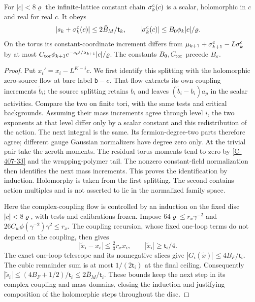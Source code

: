 \documentclass[11pt,letterpaper,reqno]{amsart}
\makeatletter
\theoremstyle{definition}
\newcommand{\ms@minorstart}{%
  \pushQED{\qed}\renewcommand{\qedsymbol}{$\blacksquare$}}
\newenvironment{proposition}[1][]{\ms@minorstart\ms@proposition[#1]}
  {\popQED\endms@proposition}
\theoremstyle{remark}
\makeatother
\begin{document}
\begin{proposition}[The constant reference chain]\label{C-407-17}
For $|c|<8\varrho$ the infinite-lattice constant chain
$\sigma_k^{\rm c}(c)$ is a scalar, holomorphic in $c$ and
real for real $c$. It obeys
\[
 |s_k+\sigma_k^{\rm c}(c)|\le2\bar B_M/\mathsf t_k,
 \qquad |\sigma_k^{\rm c}(c)|
       \le B_0\phi_k|c|/\varrho.
\]
On the torus its constant-coordinate increment differs
from $\mu_{k+1}+\sigma_{k+1}^{\rm c}-L\sigma_k^{\rm c}$
by at most
$C_{\rm tor}\phi_{k+1}e^{-c_t\ell/\lambda_{k+1}}|c|/\varrho$.
The constants $B_0,C_{\rm tor}$ precede $B_\sigma$.
\end{proposition}
\begin{proof}
Put $x_i'=x_i-L^{K-i}c$. We first identify this splitting
with the holomorphic zero-source flow at bare label $\mathsf b-c$.
That flow extracts its own coupling increments $\tilde b_i$;
the source splitting retains $b_i$ and leaves
$(\tilde b_i-b_i)a_p$ in the scalar activities.
Compare the two on finite tori, with the same tests and
critical backgrounds. Assuming their mass increments agree
through level $i$, the two exponents at that level differ
only by a scalar constant and this redistribution of the
action. The next integral is the same. Its fermion-degree-two
parts therefore agree; different gauge Gaussian normalizers
have degree zero only. At the trivial pair take the zeroth
moments. The residual torus moments tend to zero by
\cref{C-407-33} and the wrapping-polymer tail. The nonzero
constant-field normalization then identifies the next mass
increments. This proves the identification by induction.
Holomorphy is taken from the first splitting. The second
contains action multiples and is not asserted to lie in
the normalized family space.

Here the complex-coupling flow is controlled by an induction
on the fixed disc $|c|<8\varrho$, with tests and calibrations
frozen. Impose $64\varrho\le r_x\gamma^{-2}$ and
$26C_w\phi(\gamma^{-2})\gamma^2\le r_x$.
The coupling recursion, whose fixed one-loop terms do not
depend on the coupling, then gives
\[
 |\tilde x_i-x_i|\le\tfrac23r_xx_i,
       \qquad |\tilde x_i|\ge\mathsf t_i/4.
\]
The exact one-loop telescope and its nonnegative slices give
$|G_i(\tilde x)|\le4B_F/\mathsf t_i$. The cubic remainder
sum is at most $1/(2\mathsf t_i)$ at the final ceiling.
Consequently
$|\tilde s_i|\le(4B_F+1/2)/\mathsf t_i
\le2\bar B_M/\mathsf t_i$. These bounds keep the next
step in its complex coupling and mass domains, closing
the induction and justifying composition of the holomorphic
steps throughout the disc.


\end{proof}
\end{document}
